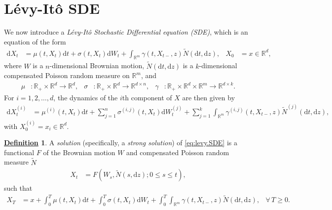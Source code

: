 \documentclass[12pt]{book}
\numberwithin{equation}{chapter}
\theoremstyle{plain}
\numberwithin{theorem}{section}
\theoremstyle{definition}
\newtheorem{definition}[theorem]{\underline{Definition}}
\numberwithin{exercise}{chapter}
\newcommand{\<}{\langle}
\renewcommand{\>}{\rangle}
\renewcommand{\(}{\left(}
\renewcommand{\)}{\right)}
\renewcommand{\[}{\left[}
\renewcommand{\]}{\right]}
\newcommand\Rb{\mathds{R}}
\newcommand\sig{\sigma}
\newcommand\gam{\gamma}
\newcommand\Nt{\widetilde{N}}
\newcommand\dd{\mathrm{d}}
\begin{document}

\section{L\'evy-It\^o SDE}
We now introduce a \emph{L\'evy-It\^o Stochastic Differential equation (SDE)}, which is an equation of the form
\begin{align}
\dd X_t
	&=	\mu(t,X_t) \dd t + \sig(t,X_t) \dd W_t + \int_{\Rb^m} \gam(t,X_{t-},z) \Nt( \dd t , \dd z) , &
X_0
	&=	x \in \Rb^d , \label{eq:levy.SDE}
\end{align}
where $W$ is a $n$-dimensional Brownian motion, $\Nt(\dd t , \dd z)$ is a $k$-dimensional compensated Poisson random measure on $\Rb^m$, and
\begin{align}
\mu
	&: \Rb_+ \times \Rb^d \to \Rb^d , &
\sig
	&: \Rb_+ \times \Rb^d \to \Rb^{d \times n} , &
\gam
	&:	\Rb_+ \times \Rb^d \times \Rb^m \to \Rb^{d \times k} .
\end{align}
For $i = 1, 2, \ldots, d$, the dynamics of the $i$th component of $X$ are then given by
\begin{align}
\dd X_t^{(i)}
	&=	\mu^{(i)}(t,X_t) \dd t + \sum_{j=1}^n \sig^{(i,j)}(t,X_t) \dd W_t^{(j)} + \sum_{j=1}^k \int_{\Rb^m} \gam^{(i,j)}(t,X_{t-},z) \Nt^{(j)}( \dd t , \dd z) , 
\end{align}
with $X_0^{(i)} =	x_i \in \Rb^d$.

\begin{definition}
A \emph{solution} (specifically, a \emph{strong solution}) of \eqref{eq:levy.SDE} is a functional $F$ of the Brownian motion $W$ and compensated Poisson random measure $\Nt$
\begin{align}
X_t
	&=	F( W_s, \Nt(s,\dd z); 0 \leq s \leq t ) ,
\end{align}
such that
\begin{align}
X_T
	&=	x + \int_0^T \mu(t,X_t) \dd t + \int_0^T \sig(t,X_t) \dd W_t + \int_0^T \int_{\Rb^m} \gam(t,X_{t-},z) \Nt( \dd t , \dd z) ,
	&\forall \, T \geq 0 .
\end{align}
\end{definition}
\end{document}
